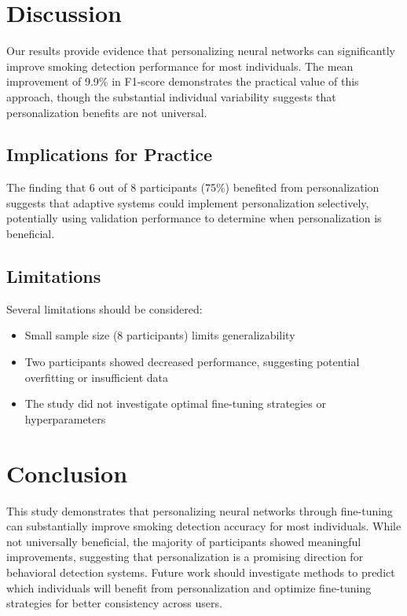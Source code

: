\documentclass[11pt]{article}
\begin{document}
\section{Discussion}
\label{sec:discussion}


Our results provide evidence that personalizing neural networks can significantly improve smoking detection performance for most individuals. The mean improvement of 9.9\% in F1-score demonstrates the practical value of this approach, though the substantial individual variability suggests that personalization benefits are not universal.

\subsection{Implications for Practice}

The finding that 6 out of 8 participants (75\%) benefited from personalization suggests that adaptive systems could implement personalization selectively, potentially using validation performance to determine when personalization is beneficial.

\subsection{Limitations}

Several limitations should be considered:
\begin{itemize}
    \item Small sample size (8 participants) limits generalizability
    \item Two participants showed decreased performance, suggesting potential overfitting or insufficient data
    \item The study did not investigate optimal fine-tuning strategies or hyperparameters
\end{itemize}

\section{Conclusion}
\label{sec:conclusion}


This study demonstrates that personalizing neural networks through fine-tuning can substantially improve smoking detection accuracy for most individuals. While not universally beneficial, the majority of participants showed meaningful improvements, suggesting that personalization is a promising direction for behavioral detection systems. Future work should investigate methods to predict which individuals will benefit from personalization and optimize fine-tuning strategies for better consistency across users.
\end{document}
